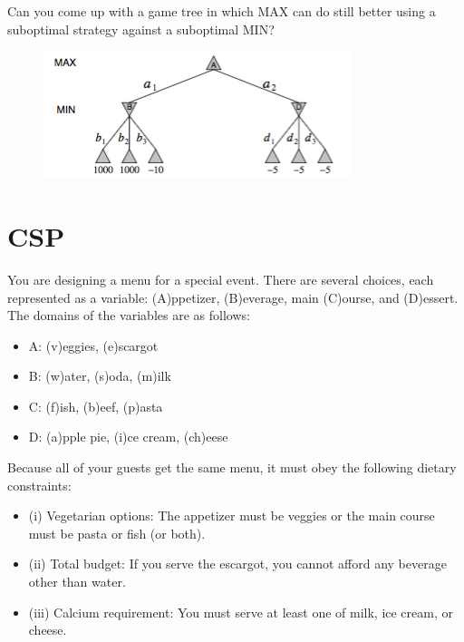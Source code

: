 \documentclass[a4paper]{article}
\begin{document}
\begin{enumerate}[(a)]
Can you come up with a game tree in which MAX can do still better using a suboptimal strategy against a suboptimal MIN?


\begin{center}
\begin{figure}[h!]
\centering
\includegraphics[width=.6\textwidth]{figs/suboptimal-min}
\end{figure}
\end{center}

\end{enumerate}

\section{CSP}

You are designing a menu for a special event. There are several choices, each represented as a variable:
(A)ppetizer, (B)everage, main (C)ourse, and (D)essert. The domains of the variables are as follows:
\begin{itemize}
\item A: (v)eggies, (e)scargot
\item B: (w)ater, (s)oda, (m)ilk
\item C: (f)ish, (b)eef, (p)asta
\item D: (a)pple pie, (i)ce cream, (ch)eese
\end{itemize}
Because all of your guests get the same menu, it must obey the following dietary constraints:
\begin{itemize}
\item (i) Vegetarian options: The appetizer must be veggies or the main course must be pasta or fish (or both).
\item (ii) Total budget: If you serve the escargot, you cannot afford any beverage other than water.
\item (iii) Calcium requirement: You must serve at least one of milk, ice cream, or cheese.
\end{itemize}
\end{document}
